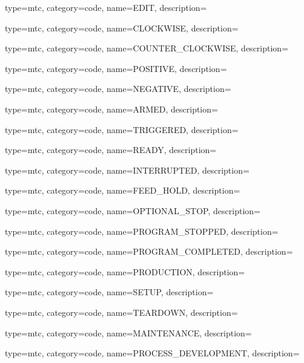 {
  type=mtc,
  category=code,
  name={EDIT},
  description={}
}

{
  type=mtc,
  category=code,
  name={CLOCKWISE},
  description={}
}

{
  type=mtc,
  category=code,
  name={COUNTER\_CLOCKWISE},
  description={}
}

{
  type=mtc,
  category=code,
  name={POSITIVE},
  description={}
}

{
  type=mtc,
  category=code,
  name={NEGATIVE},
  description={}
}

{
  type=mtc,
  category=code,
  name={ARMED},
  description={}
}

{
  type=mtc,
  category=code,
  name={TRIGGERED},
  description={}
}

{
  type=mtc,
  category=code,
  name={READY},
  description={}
}

{
  type=mtc,
  category=code,
  name={INTERRUPTED},
  description={}
}

{
  type=mtc,
  category=code,
  name={FEED\_HOLD},
  description={}
}

{
  type=mtc,
  category=code,
  name={OPTIONAL\_STOP},
  description={}
}

{
  type=mtc,
  category=code,
  name={PROGRAM\_STOPPED},
  description={}
}

{
  type=mtc,
  category=code,
  name={PROGRAM\_COMPLETED},
  description={}
}


{
  type=mtc,
  category=code,
  name={PRODUCTION},
  description={}
}

{
  type=mtc,
  category=code,
  name={SETUP},
  description={}
}

{
  type=mtc,
  category=code,
  name={TEARDOWN},
  description={}
}

{
  type=mtc,
  category=code,
  name={MAINTENANCE},
  description={}
}

{
  type=mtc,
  category=code,
  name={PROCESS\_DEVELOPMENT},
  description={}
}


